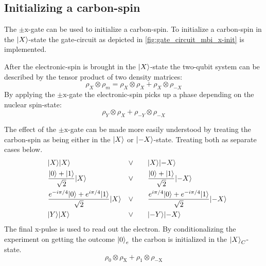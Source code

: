 \subsection{Initializing a carbon-spin}
The $\pm\mathrm{x}$-gate can be used to initialize a carbon-spin.
To initialize a carbon-spin  in the $ {\left\vert{X}\right\rangle}$-state the gate-circuit as depicted in \cref{fig:gate_circuit_mbi_x-init} is implemented.

After the electronic-spin is brought in the ${\left\vert{X}\right\rangle}$-state the two-qubit system can be described by the tensor product of two density matrices:
\begin{equation}
    \rho_X \otimes \rho_m = \rho_X \otimes \rho_{X} +\rho_X \otimes \rho_{-X}
\end{equation}
By applying the $\pm{\mathrm{x}}$-gate  the electronic-spin picks up a phase depending on the nuclear spin-state:
\begin{equation}
     \rho_Y \otimes \rho_{X} +\rho_{-Y} \otimes \rho_{-X}
    \label{eq:density_after_Ren}
\end{equation}

The effect of the $\pm{\mathrm{x}}$-gate can be made more easily understood by treating the carbon-spin as being either in the ${\left\vert{X}\right\rangle}$ or ${\left\vert{-X}\right\rangle}$-state. Treating both as separate cases below.
\begin{align}
    \quad &{\left\vert{X}\right\rangle}{\left\vert{X}\right\rangle} &\vee \quad &  \quad{\left\vert{X}\right\rangle}{\left\vert{-X}\right\rangle}\\
    \quad &\frac{{\left\vert{0}\right\rangle}+{\left\vert{1}\right\rangle}}{\sqrt{2}}{\left\vert{X}\right\rangle} &\vee \quad & \quad \frac{{\left\vert{0}\right\rangle}+{\left\vert{1}\right\rangle}}{\sqrt{2}}{\left\vert{-X}\right\rangle} \\
    \quad &\frac{e^{-i\pi/4}{\left\vert{0}\right\rangle}+e^{i\pi/4}{\left\vert{1}\right\rangle}}{\sqrt{2}}{\left\vert{X}\right\rangle} &\vee \quad & \quad \frac{e^{i\pi/4}{\left\vert{0}\right\rangle}+e^{-i\pi/4}{\left\vert{1}\right\rangle}}{\sqrt{2}}{\left\vert{-X}\right\rangle}\\
    \quad &{\left\vert{Y}\right\rangle}{\left\vert{X}\right\rangle} &\vee \quad & \quad {\left\vert{-Y}\right\rangle}{\left\vert{-X}\right\rangle}
\end{align}
The final x-pulse is used to read out the electron. By conditionalizing the experiment on getting the outcome ${\left\vert{0}\right\rangle}_e$ the carbon is initialized in the ${\left\vert{X}\right\rangle}_C$-state.
\begin{equation}
    \rho_0 \otimes \rho_{\mathrm{X}} + \rho_1 \otimes \rho_{\mathrm{-X}}
\end{equation}

